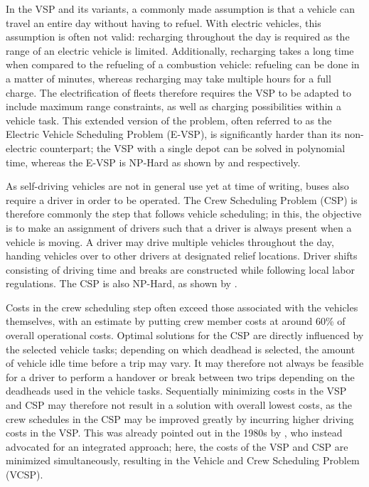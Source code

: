 \documentclass[]{article}
\begin{document}
In the VSP and its variants, a commonly made assumption is that a vehicle can travel an entire day without having to refuel. With electric vehicles, this assumption is often not valid: recharging throughout the day is required as the range of an electric vehicle is limited. Additionally, recharging takes a long time when compared to the refueling of a combustion vehicle: refueling can be done in a matter of minutes, whereas recharging may take multiple hours for a full charge. The electrification of fleets therefore requires the VSP to be adapted to include maximum range constraints, as well as charging possibilities within a vehicle task. This extended version of the problem, often referred to as the Electric Vehicle Scheduling Problem (E-VSP), is significantly harder than its non-electric counterpart; the VSP with a single depot can be solved in polynomial time, whereas the E-VSP is NP-Hard as shown by \citet{Bunte2009} and \citet{Sassi2014} respectively.

As self-driving vehicles are not in general use yet at time of writing, buses also require a driver in order to be operated. The Crew Scheduling Problem (CSP) is therefore commonly the step that follows vehicle scheduling; in this, the objective is to make an assignment of drivers such that a driver is always present when a vehicle is moving. A driver may drive multiple vehicles throughout the day, handing vehicles over to other drivers at designated relief locations. Driver shifts consisting of driving time and breaks are constructed while following local labor regulations. The CSP is also NP-Hard, as shown by \citet{Fischetti1989}.

Costs in the crew scheduling step often exceed those associated with the vehicles themselves, with an estimate by \citet{Perumal2019Crew} putting crew member costs at around 60\% of overall operational costs. Optimal solutions for the CSP are directly influenced by the selected vehicle tasks; depending on which deadhead is selected, the amount of vehicle idle time before a trip may vary. It may therefore not always be feasible for a driver to perform a handover or break between two trips depending on the deadheads used in the vehicle tasks. Sequentially minimizing costs in the VSP and CSP may therefore not result in a solution with overall lowest costs, as the crew schedules in the CSP may be improved greatly by incurring higher driving costs in the VSP. This was already pointed out in the 1980s by \citet{Bodin1983}, who instead advocated for an integrated approach; here, the costs of the VSP and CSP are minimized simultaneously, resulting in the Vehicle and Crew Scheduling Problem (VCSP). \\
\end{document}
